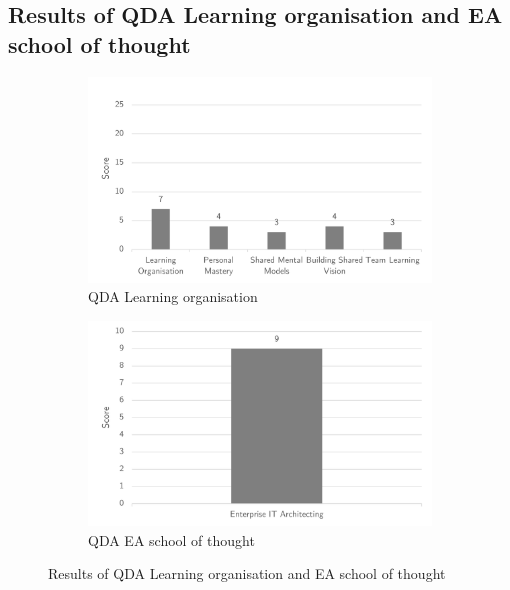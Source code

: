 \subsection{Results of QDA Learning organisation and EA school of thought}
\label{sub:resultsqdalearningandea}
\begin{figure}[H]
	\centering
	\begin{subfigure}[H]{0.475\textwidth}
		\centering
		\includegraphics[width=\textwidth]{images/qdalearningorganisation}
		\caption{QDA Learning organisation}
		\label{fig:qdalearning}
	\end{subfigure}%
\hfill
	\begin{subfigure}[H]{0.475\textwidth}
		\centering
		\includegraphics[width=\textwidth]{images/qdaeaschool}
		\caption{QDA EA school of thought}
		\label{fig:qdaea}
	\end{subfigure}
	\caption{Results of QDA Learning organisation and EA school of thought}
	\label{fig:resultsofqda}
\end{figure}

